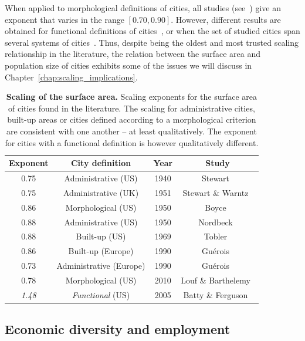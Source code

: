 When applied to morphological definitions of cities, all studies
(see~\cite{Batty:2011}) give an exponent that varies in the range $[0.70,
0.90]$. However, different results are obtained for functional definitions of
cities~\cite{Batty:2011}, or when the set of studied cities span several systems of
cities~\cite{Fuller:2009}. Thus, despite being the oldest and most trusted scaling relationship in the
literature, the relation between the surface area and population size of cities
exhibits some of the issues we will discuss in
Chapter~\ref{chap:scaling_implications}.


\begin{table}[!h]
    \centering
\begin{tabular}{|cccc|}
\hline
Exponent & City definition & Year & Study\\
\hline
0.75 & Administrative (US) & 1940 & Stewart~\cite{Stewart:1947}\\
0.75 & Administrative (UK) & 1951 & Stewart \& Warntz~\cite{Stewart:1958}\\
0.86 & Morphological (US) & 1950 & Boyce~\cite{Boyce:1963}\\
0.88 & Administrative (US) & 1950 & Nordbeck~\cite{Nordbeck:1965}\\
0.88 & Built-up (US) & 1969 & Tobler~\cite{Tobler:1969}\\
0.86 & Built-up (Europe) & 1990 & Gu\'erois~\cite{Guerois:2003}\\
0.73 & Administrative (Europe) & 1990 & Gu\'erois~\cite{Guerois:2003}\\
0.78 & Morphological (US) & 2010 & Louf \& Barthelemy~\cite{Louf:2014_scaling}\\
\hline
\emph{1.48} & \emph{Functional} (US) & 2005 & Batty \& Ferguson~\cite{Batty:2011}\\
\hline
\end{tabular}
\caption{{\bf Scaling of the surface area.} Scaling exponents for the surface area of
cities found in the literature. The scaling for administrative cities, built-up
areas or cities defined according to a morphological criterion are consistent
with one another -- at least qualitatively. The exponent for cities with a
functional definition is however qualitatively different.}
\label{tab:area}
\end{table}



\subsection{Economic diversity and employment}
\label{sub:economic_diversity}

